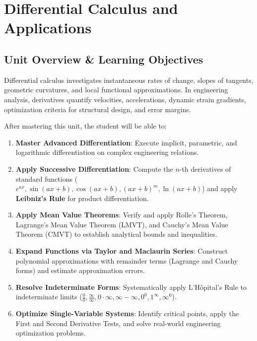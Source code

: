 \chapter{Differential Calculus and Applications}
\label{chap:differential-calculus}

\section{Unit Overview \& Learning Objectives}

Differential calculus investigates instantaneous rates of change, slopes of tangents, geometric curvatures, and local functional approximations. In engineering analysis, derivatives quantify velocities, accelerations, dynamic strain gradients, optimization criteria for structural design, and error margins.

\begin{important}
After mastering this unit, the student will be able to:
\begin{enumerate}[leftmargin=1.5em]
    \item \textbf{Master Advanced Differentiation}: Execute implicit, parametric, and logarithmic differentiation on complex engineering relations.
    \item \textbf{Apply Successive Differentiation}: Compute the $n$-th derivatives of standard functions ($e^{ax}, \sin(ax+b), \cos(ax+b), (ax+b)^m, \ln(ax+b)$) and apply \textbf{Leibniz's Rule} for product differentiation.
    \item \textbf{Apply Mean Value Theorems}: Verify and apply Rolle's Theorem, Lagrange's Mean Value Theorem (LMVT), and Cauchy's Mean Value Theorem (CMVT) to establish analytical bounds and inequalities.
    \item \textbf{Expand Functions via Taylor and Maclaurin Series}: Construct polynomial approximations with remainder terms (Lagrange and Cauchy forms) and estimate approximation errors.
    \item \textbf{Resolve Indeterminate Forms}: Systematically apply L'H\^opital's Rule to indeterminate limits ($\frac{0}{0}, \frac{\infty}{\infty}, 0 \cdot \infty, \infty - \infty, 0^0, 1^\infty, \infty^0$).
    \item \textbf{Optimize Single-Variable Systems}: Identify critical points, apply the First and Second Derivative Tests, and solve real-world engineering optimization problems.
\end{enumerate}
\end{important}

